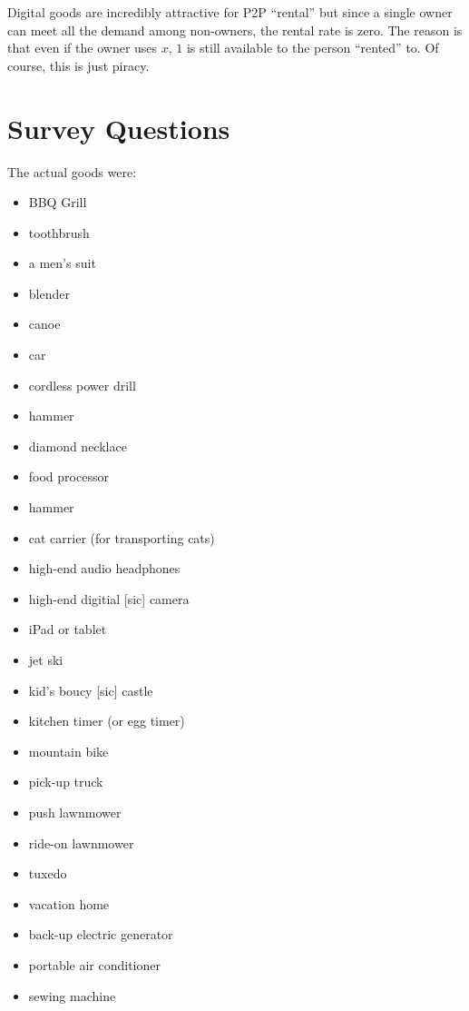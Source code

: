 \documentclass[11pt]{article}
\begin{document}
Digital goods are incredibly attractive for P2P ``rental'' but since a single owner can meet all the demand among non-owners, the rental rate is zero.
The reason is that even if the owner uses $x$, $1$ is still available to the person ``rented'' to.  
Of course, this is just piracy. 


\cite{sinai2005}
\cite{ikkala2014defining}
\cite{varian2000} 
\cite{byers2013rise} 
\cite{becker1965theory} 




\newpage 

\appendix 

\section{Survey Questions \label{sec:survey}} 

The actual goods were: 

\begin{itemize} 
\item BBQ Grill
\item toothbrush
\item a men's suit
\item blender
\item canoe
\item car
\item cordless power drill
\item hammer
\item diamond necklace
\item food processor
\item hammer
\item cat carrier (for transporting cats)
\item high-end audio headphones
\item high-end digitial [sic] camera
\item iPad or tablet
\item jet ski
\item kid's boucy [sic] castle
\item kitchen timer (or egg timer)
\item mountain bike
\item pick-up truck
\item push lawnmower
\item ride-on lawnmower
\item tuxedo
\item vacation home
\item back-up electric generator
\item portable air conditioner
\item sewing machine
\end{itemize} 
\end{document}
